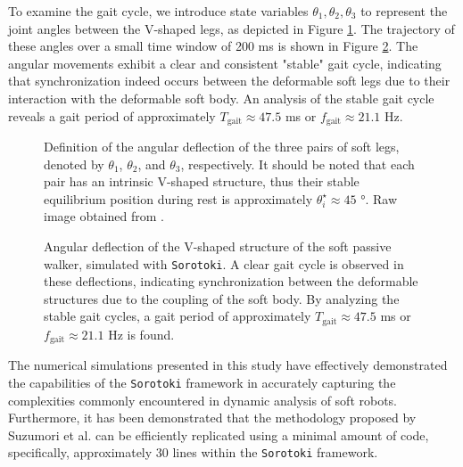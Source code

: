 To examine the gait cycle, we introduce state variables $\theta_1, \theta_2, \theta_3$ to represent the joint angles between the V-shaped legs, as depicted in Figure \ref{fig:C5:passivewalker_states}. The trajectory of these angles over a small time window of 200 \si{\milli \second} is shown in Figure \ref{fig:C5:passivewalker_gait}. The angular movements exhibit a clear and consistent "stable" gait cycle, indicating that synchronization indeed occurs between the deformable soft legs due to their interaction with the deformable soft body. An analysis of the stable gait cycle reveals a gait period of approximately $T_{\textrm{gait}} \approx 47.5$ \si{\milli \second} or $f_{\textrm{gait}} \approx 21.1$ \si{\hertz}.
%
\begin{figure}[!t]
    \centering
    \def\svgwidth{0.65\textwidth}
    
    \caption{\small Definition of the angular deflection of the three pairs of soft legs, denoted by $\theta_1$, $\theta_2$, and $\theta_3$, respectively. It should be noted that each pair has an intrinsic V-shaped structure, thus their stable equilibrium position during rest is approximately $\theta_i^\star \approx 45$ \si{\degree}. Raw image obtained from \cite{Suzumori2008Sep}.}
    \label{fig:C5:passivewalker_states}
    \vspace{-2mm}
    \end{figure}
    \begin{figure}[!t]
        
        
        \caption{\small Angular deflection of the V-shaped structure of the soft passive walker, simulated with \texttt{Sorotoki}. A clear gait cycle is observed in these deflections, indicating synchronization between the deformable structures due to the coupling of the soft body. By analyzing the stable gait cycles, a gait period of approximately $T_{\textrm{gait}} \approx 47.5$ \si{\milli \second} or $f_{\textrm{gait}} \approx 21.1$ \si{\hertz} is found.}
        \label{fig:C5:passivewalker_gait}
        \vspace{-6mm}
    \end{figure}
%
The numerical simulations presented in this study have effectively demonstrated the capabilities of the  \texttt{Sorotoki} framework in accurately capturing the complexities commonly encountered in dynamic analysis of soft robots. Furthermore, it has been demonstrated that the methodology proposed by Suzumori et al. \cite{Suzumori2008Sep} can be efficiently replicated using a minimal amount of code, specifically, approximately 30 lines within the \texttt{Sorotoki} framework.

